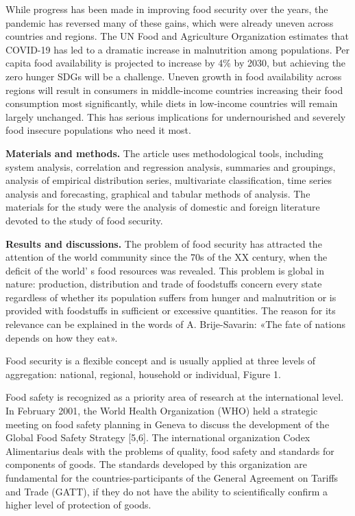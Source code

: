\begin{multicols}{2}
While progress has been made in improving food security over the years,
the pandemic has reversed many of these gains, which were already uneven
across countries and regions. The UN Food and Agriculture Organization
estimates that COVID-19 has led to a dramatic increase in malnutrition
among populations. Per capita food availability is projected to increase
by 4\% by 2030, but achieving the zero hunger SDGs will be a challenge.
Uneven growth in food availability across regions will result in
consumers in middle-income countries increasing their food consumption
most significantly, while diets in low-income countries will remain
largely unchanged. This has serious implications for undernourished and
severely food insecure populations who need it most.

{\bfseries Materials and methods.} The article uses methodological tools,
including system analysis, correlation and regression analysis,
summaries and groupings, analysis of empirical distribution series,
multivariate classification, time series analysis and forecasting,
graphical and tabular methods of analysis. The materials for the study
were the analysis of domestic and foreign literature devoted to the
study of food security.

{\bfseries Results and discussions.} The problem of food security has
attracted the attention of the world community since the 70s of the XX
century, when the deficit of the world' s food resources
was revealed. This problem is global in nature: production, distribution
and trade of foodstuffs concern every state regardless of whether its
population suffers from hunger and malnutrition or is provided with
foodstuffs in sufficient or excessive quantities. The reason for its
relevance can be explained in the words of A. Brije-Savarin: «The fate
of nations depends on how they eat».

Food security is a flexible concept and is usually applied at three
levels of aggregation: national, regional, household or individual,
Figure 1.

Food safety is recognized as a priority area of research at the
international level. In February 2001, the World Health Organization
(WHO) held a strategic meeting on food safety planning in Geneva to
discuss the development of the Global Food Safety Strategy {[}5,6{]}.
The international organization Codex Alimentarius deals with the
problems of quality, food safety and standards for components of goods.
The standards developed by this organization are fundamental for the
countries-participants of the General Agreement on Tariffs and Trade
(GATT), if they do not have the ability to scientifically confirm a
higher level of protection of goods.


\end{multicols}

